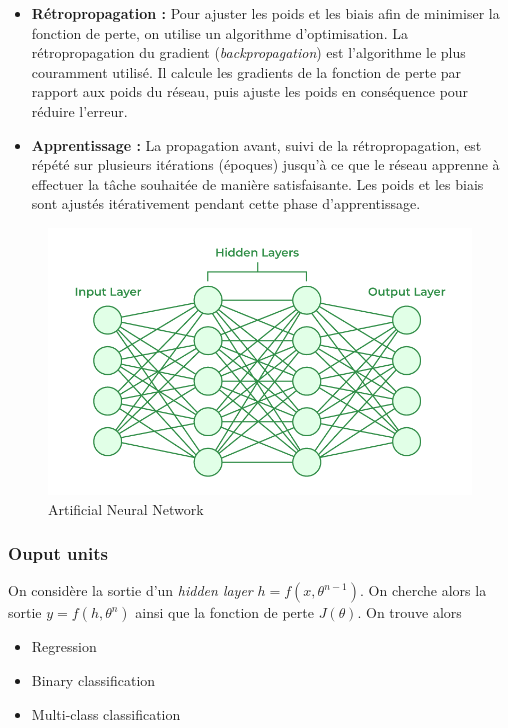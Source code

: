 \documentclass[a4paper]{article}
\begin{document}
\begin{itemize}
    \item \textbf{Rétropropagation :} Pour ajuster les poids et les biais afin de minimiser la fonction de perte, on utilise un algorithme d'optimisation. La rétropropagation du gradient (\textit{backpropagation}) est l'algorithme le plus couramment utilisé. Il calcule les gradients de la fonction de perte par rapport aux poids du réseau, puis ajuste les poids en conséquence pour réduire l'erreur.

    \item \textbf{Apprentissage :} La propagation avant, suivi de la rétropropagation, est répété sur plusieurs itérations (époques) jusqu'à ce que le réseau apprenne à effectuer la tâche souhaitée de manière satisfaisante. Les poids et les biais sont ajustés itérativement pendant cette phase d'apprentissage.
\end{itemize}

\begin{figure}[H]
    \centering
    \includegraphics[scale=0.4]{figures/ann.png}
    \caption{Artificial Neural Network}
    \label{fig:enter-label}
\end{figure}

\subsubsection{Ouput units}

On considère la sortie d'un \textit{hidden layer} $h= f(x, \theta^{n-1})$. On cherche alors la sortie $y= f(h, \theta^{n})$ ainsi que la fonction de perte $J(\theta)$. On trouve alors 
\begin{itemize}
    \item Regression
    \item Binary classification
    \item Multi-class classification
\end{itemize}
\end{document}
